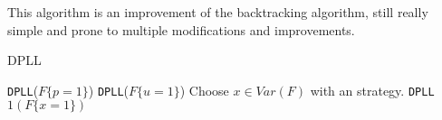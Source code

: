 This algorithm is an improvement of the backtracking algorithm, still really simple and prone to multiple modifications and improvements. 

\begin{algorithm}
  \caption{DPLL}\label{dpll}
  \begin{algorithmic}[1]
     
    \EndIf
     
    \EndIf
    \State
     \Return \texttt{DPLL}($F\{p=1\}$)
    \EndIf
     \Return \texttt{DPLL}($F\{u=1\}$)
  \EndIf
  \State
  \State Choose $x \in Var(F)$ with an strategy.
   
  \EndIf
  \State \Return \texttt{DPLL}$1(F\{x=1\})$
\end{algorithmic}
\end{algorithm}

